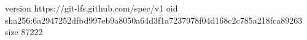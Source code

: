 version https://git-lfs.github.com/spec/v1
oid sha256:6a2947252dfbd997eb9a8050a64d3f1a7237978f04d168c2c785a218fca89263
size 87222
